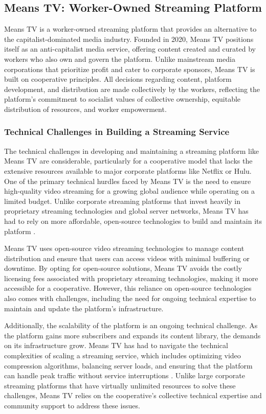 \begin{refsection}
\subsection{Means TV: Worker-Owned Streaming Platform}

Means TV is a worker-owned streaming platform that provides an alternative to the capitalist-dominated media industry. Founded in 2020, Means TV positions itself as an anti-capitalist media service, offering content created and curated by workers who also own and govern the platform. Unlike mainstream media corporations that prioritize profit and cater to corporate sponsors, Means TV is built on cooperative principles. All decisions regarding content, platform development, and distribution are made collectively by the workers, reflecting the platform’s commitment to socialist values of collective ownership, equitable distribution of resources, and worker empowerment.

\subsubsection{Technical Challenges in Building a Streaming Service}

The technical challenges in developing and maintaining a streaming platform like Means TV are considerable, particularly for a cooperative model that lacks the extensive resources available to major corporate platforms like Netflix or Hulu. One of the primary technical hurdles faced by Means TV is the need to ensure high-quality video streaming for a growing global audience while operating on a limited budget. Unlike corporate streaming platforms that invest heavily in proprietary streaming technologies and global server networks, Means TV has had to rely on more affordable, open-source technologies to build and maintain its platform \cite[pp.~45-60]{scholz2017}.

Means TV uses open-source video streaming technologies to manage content distribution and ensure that users can access videos with minimal buffering or downtime. By opting for open-source solutions, Means TV avoids the costly licensing fees associated with proprietary streaming technologies, making it more accessible for a cooperative. However, this reliance on open-source technologies also comes with challenges, including the need for ongoing technical expertise to maintain and update the platform’s infrastructure.

Additionally, the scalability of the platform is an ongoing technical challenge. As the platform gains more subscribers and expands its content library, the demands on its infrastructure grow. Means TV has had to navigate the technical complexities of scaling a streaming service, which includes optimizing video compression algorithms, balancing server loads, and ensuring that the platform can handle peak traffic without service interruptions \cite[pp.~120-136]{mason2015}. Unlike large corporate streaming platforms that have virtually unlimited resources to solve these challenges, Means TV relies on the cooperative's collective technical expertise and community support to address these issues.


\end{refsection}
